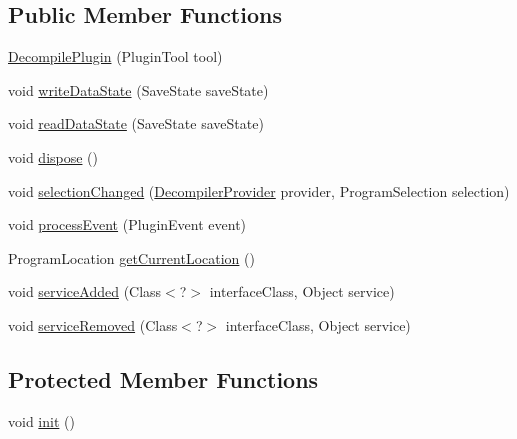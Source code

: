 \subsection*{Public Member Functions}
\begin{DoxyCompactItemize}
\item 
\mbox{\hyperlink{classghidra_1_1app_1_1plugin_1_1core_1_1decompile_1_1_decompile_plugin_a85143bc76c867a114862e9b1e8d80501}{Decompile\+Plugin}} (Plugin\+Tool tool)
\item 
void \mbox{\hyperlink{classghidra_1_1app_1_1plugin_1_1core_1_1decompile_1_1_decompile_plugin_a7f6e36998681226e7abe9ed2debc58a6}{write\+Data\+State}} (Save\+State save\+State)
\item 
void \mbox{\hyperlink{classghidra_1_1app_1_1plugin_1_1core_1_1decompile_1_1_decompile_plugin_a60c3bde2ea8b6488190f86e0f9da432b}{read\+Data\+State}} (Save\+State save\+State)
\item 
void \mbox{\hyperlink{classghidra_1_1app_1_1plugin_1_1core_1_1decompile_1_1_decompile_plugin_afc6e062562a006b9b18da6d768b9c45d}{dispose}} ()
\item 
void \mbox{\hyperlink{classghidra_1_1app_1_1plugin_1_1core_1_1decompile_1_1_decompile_plugin_a9c2782ea5bd9d52ed1e1c67e1eb63c75}{selection\+Changed}} (\mbox{\hyperlink{classghidra_1_1app_1_1plugin_1_1core_1_1decompile_1_1_decompiler_provider}{Decompiler\+Provider}} provider, Program\+Selection selection)
\item 
void \mbox{\hyperlink{classghidra_1_1app_1_1plugin_1_1core_1_1decompile_1_1_decompile_plugin_a9d97e39f73e8cf926190eaa1551dffde}{process\+Event}} (Plugin\+Event event)
\item 
Program\+Location \mbox{\hyperlink{classghidra_1_1app_1_1plugin_1_1core_1_1decompile_1_1_decompile_plugin_aabc9f011dedde6e5957107ec9f327bf6}{get\+Current\+Location}} ()
\item 
void \mbox{\hyperlink{classghidra_1_1app_1_1plugin_1_1core_1_1decompile_1_1_decompile_plugin_aed00c4c6a2838059ff1ba5cf77ddf187}{service\+Added}} (Class$<$?$>$ interface\+Class, Object service)
\item 
void \mbox{\hyperlink{classghidra_1_1app_1_1plugin_1_1core_1_1decompile_1_1_decompile_plugin_a39d836be685ba7271ce9828d7439a98e}{service\+Removed}} (Class$<$?$>$ interface\+Class, Object service)
\end{DoxyCompactItemize}
\subsection*{Protected Member Functions}
\begin{DoxyCompactItemize}
\item 
void \mbox{\hyperlink{classghidra_1_1app_1_1plugin_1_1core_1_1decompile_1_1_decompile_plugin_ab5185d2297c3c40d03e34c49bf203138}{init}} ()
\end{DoxyCompactItemize}


